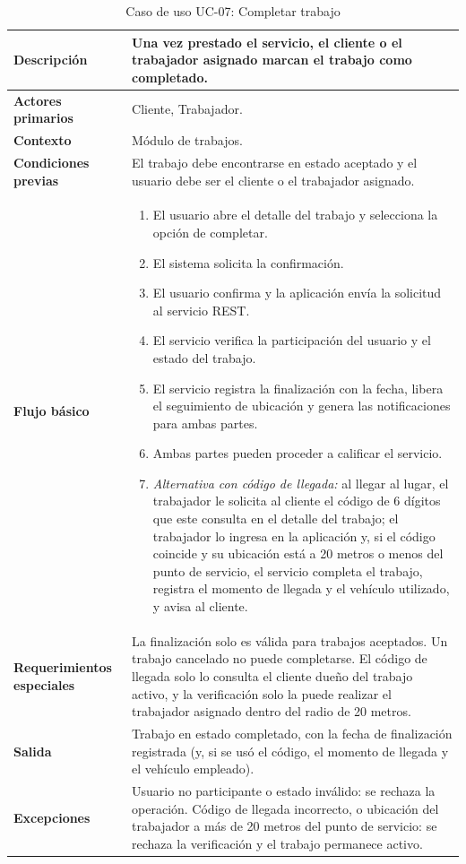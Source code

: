 \documentclass[doc,12pt,a4paper]{apa7}
\begin{document}
\begin{longtable}{|P{3.3cm}|L{11.2cm}|}
\caption{Caso de uso UC-07: Completar trabajo}\\
\hline
\textbf{Descripción} & Una vez prestado el servicio, el cliente o el trabajador asignado marcan el trabajo como completado. \\ \hline
\textbf{Actores primarios} & Cliente, Trabajador. \\ \hline
\textbf{Contexto} & Módulo de trabajos. \\ \hline
\textbf{Condiciones previas} & El trabajo debe encontrarse en estado aceptado y el usuario debe ser el cliente o el trabajador asignado. \\ \hline
\textbf{Flujo básico} &
\begin{enumerate}
    \item El usuario abre el detalle del trabajo y selecciona la opción de completar.
    \item El sistema solicita la confirmación.
    \item El usuario confirma y la aplicación envía la solicitud al servicio REST.
    \item El servicio verifica la participación del usuario y el estado del trabajo.
    \item El servicio registra la finalización con la fecha, libera el seguimiento de ubicación y genera las notificaciones para ambas partes.
    \item Ambas partes pueden proceder a calificar el servicio.
    \item \textit{Alternativa con código de llegada:} al llegar al lugar, el trabajador le solicita al cliente el código de 6 dígitos que este consulta en el detalle del trabajo; el trabajador lo ingresa en la aplicación y, si el código coincide y su ubicación está a 20 metros o menos del punto de servicio, el servicio completa el trabajo, registra el momento de llegada y el vehículo utilizado, y avisa al cliente.
\end{enumerate} \\ \hline
\textbf{Requerimientos especiales} & La finalización solo es válida para trabajos aceptados. Un trabajo cancelado no puede completarse. El código de llegada solo lo consulta el cliente dueño del trabajo activo, y la verificación solo la puede realizar el trabajador asignado dentro del radio de 20 metros. \\ \hline
\textbf{Salida} & Trabajo en estado completado, con la fecha de finalización registrada (y, si se usó el código, el momento de llegada y el vehículo empleado). \\ \hline
\textbf{Excepciones} & Usuario no participante o estado inválido: se rechaza la operación. Código de llegada incorrecto, o ubicación del trabajador a más de 20 metros del punto de servicio: se rechaza la verificación y el trabajo permanece activo. \\ \hline
\end{longtable}
\end{document}

